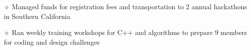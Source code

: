 \documentclass [11pt]{article}
\begin{document}
\begin{flushleft}
‭‭\quad\quad\quad$\diamond$ Managed funds for registration fees and transportation to 2 annual hackathons in Southern California

‭‭\quad\quad\quad$\diamond$ Ran weekly training workshops for C++ and algorithms to prepare 9 members for coding and design challenges




\end{flushleft}
\end{document}
